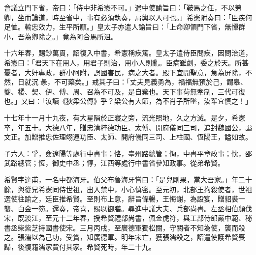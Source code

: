 \begin{pinyinscope}
 會議立門下省，帝曰：「侍中非希憲不可。」遣中使諭旨曰：「鞍馬之任，不以勞卿，坐而論道，時至省中，事有必須執奏，肩輿以入可也。」希憲附奏曰：「臣疾何足恤。輸忠效力，生平所願。」皇太子亦遣人諭旨曰：「上命卿領門下省，無憚群小，吾為卿除之。」竟為阿合馬所沮。



 十六年春，賜鈔萬貫，詔復入中書，希憲稱疾篤。皇太子遣侍臣問疾，因問治道，希憲曰：「君天下在用人，用君子則治，用小人則亂。臣病雖劇，委之於天。所甚憂者，大奸專政，群小阿附，誤國害民，病之大者。殿下宜開聖意，急為屏除，不然，日就沉彖，不可藥矣。」戒其子曰：「丈夫見義勇為，禍福無預於己，謂皋、夔、稷、契、伊、傅、周、召為不可及，是自棄也。天下事茍無牽制，三代可復也。」又曰：「汝讀《狄梁公傳》乎？梁公有大節，為不肖子所墜，汝輩宜慎之！」



 十七年十一月十九夜，有大星隕於正寢之旁，流光照地，久之方滅。是夕，希憲卒，年五十。大德八年，贈忠清粹德功臣、太傅、開府儀同三司，追封魏國公，謚文正。加贈推忠佐理翊運功臣、太師、開府儀同三司、上柱國、恆陽王，謚如故。



 子六人：孚，僉遼陽等處行中書事；恪，臺州路總管；恂，中書平章政事；忱，邵武路總管；恆，御史中丞；惇，江西等處行中書省參知政事。從弟希賢。



 希賢字達甫，一名中都海牙。伯父布魯海牙嘗曰：「是兒剛果，當大吾家。」年二十餘，與從兄希憲同侍世祖，出入禁中，小心慎密。至元初，北部王拘殺使者，世祖選使往諭之，廷臣推希賢。至則布上意，辭旨條暢，王悔謝，為設宴，贈貂裘一襲、白金一笏。還奏，帝喜，賜以御膳。尋進中議大夫、兵部尚書。左丞相伯顏伐宋，既渡江，至元十二年春，授希賢禮部尚書，佩金虎符，與工部侍郎嚴中範、秘書丞柴紫芝持國書使宋。三月丙戌，至廣德軍獨松關，守關者不知為使，襲而殺之。張濡以為己功，受賞，知廣德軍。明年宋亡，獲張濡殺之，詔遣使護希賢喪歸，後復籍濡家貲付其家。希賢死時，年二十九。



\end{pinyinscope}